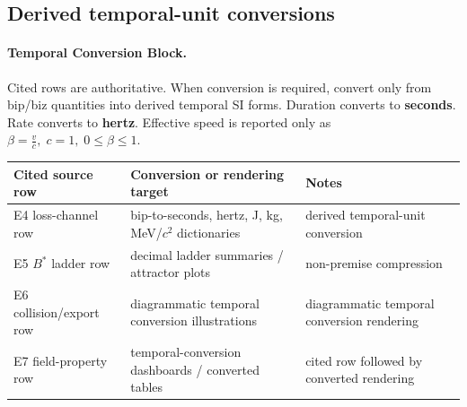 \subsection{Derived temporal-unit conversions}\label{app:si-routing}
\paragraph{Temporal Conversion Block.} Cited rows are authoritative. When conversion is required, convert only from bip/biz quantities into derived temporal SI forms. Duration converts to \textbf{seconds}. Rate converts to \textbf{hertz}. Effective speed is reported only as $\beta=\frac{v}{c},\;c=1,\;0\le\beta\le1$.

\begin{center}
\begin{tabularx}{\linewidth}{@{}lXl@{}}
\toprule
Cited source row & Conversion or rendering target & Notes \\
\midrule
E4 loss-channel row & bip-to-seconds, hertz, J, kg, MeV/$c^2$ dictionaries & derived temporal-unit conversion \\
E5 $B^*$ ladder row & decimal ladder summaries / attractor plots & non-premise compression \\
E6 collision/export row & diagrammatic temporal conversion illustrations & diagrammatic temporal conversion rendering \\
E7 field-property row & temporal-conversion dashboards / converted tables & cited row followed by converted rendering \\
\bottomrule
\end{tabularx}
\end{center}
